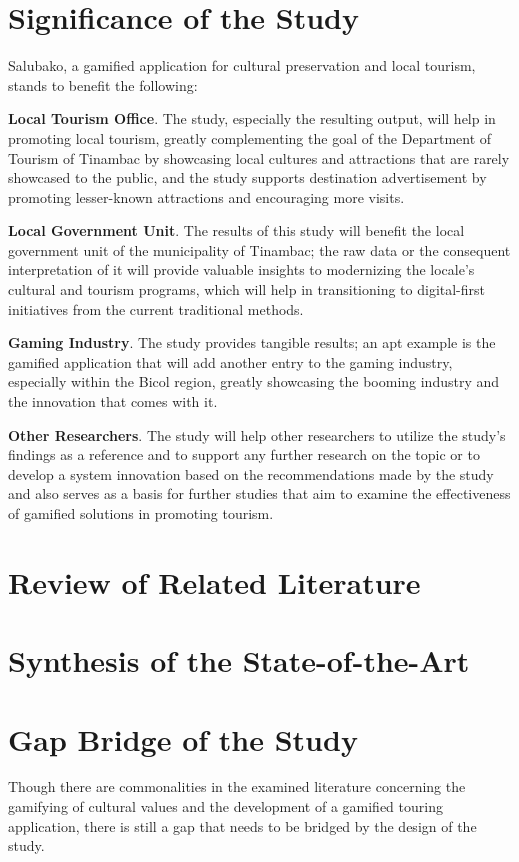 \documentclass[11pt]{research}
\begin{document}
\section{Significance of the Study}
Salubako, a gamified application for cultural preservation and local tourism, stands to benefit the following:

\textbf{Local Tourism Office}. The study, especially the resulting output, will help in promoting local tourism, greatly complementing the goal of the Department of Tourism of Tinambac by showcasing local cultures and attractions that are rarely showcased to the public, and the study supports destination advertisement by promoting lesser-known attractions and encouraging more visits.

\textbf{Local Government Unit}. The results of this study will benefit the local government unit of the municipality of Tinambac; the raw data or the consequent interpretation of it will provide valuable insights to modernizing the locale’s cultural and tourism programs, which will help in transitioning to digital-first initiatives from the current traditional methods.

\textbf{Gaming Industry}. The study provides tangible results; an apt example is the gamified application that will add another entry to the gaming industry, especially within the Bicol region, greatly showcasing the booming industry and the innovation that comes with it. 

\textbf{Other Researchers}. The study will help other researchers to utilize the study’s findings as a reference and to support any further research on the topic or to develop a system innovation based on the recommendations made by the study and also serves as a basis for further studies that aim to examine the effectiveness of gamified solutions in promoting tourism.

\section{Review of Related Literature}


\section{Synthesis of the State-of-the-Art}


\section{Gap Bridge of the Study}
Though there are commonalities in the examined literature concerning the gamifying of cultural values and the development of a gamified touring application, there is still a gap that needs to be bridged by the design of the study.
\end{document}
